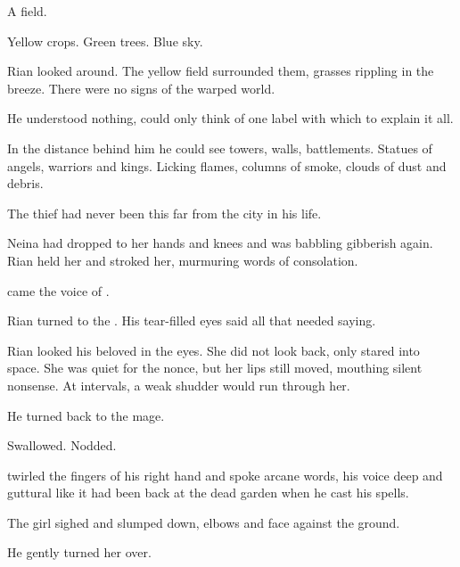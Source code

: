 A field. 

Yellow crops. 
Green trees. 
Blue sky. 


Rian looked around. 
The yellow field surrounded them, grasses rippling in the breeze. 
There were no signs of the warped world. 

He understood nothing, could only think of one label with which to explain it all. 

In the distance behind him he could see towers, walls, battlements. 
Statues of angels, warriors and kings. 
Licking flames, columns of smoke, clouds of dust and debris. 

The thief had never been this far from the city in his life. 

Neina had dropped to her hands and knees and was babbling gibberish again. 
Rian held her and stroked her, murmuring words of consolation. 

 came the voice of \Ishnaruchaefir. 

Rian turned to the \dragon. 
His tear-filled eyes said all that needed saying. 


Rian looked his beloved in the eyes. 
She did not look back, only stared into space. 
She was quiet for the nonce, but her lips still moved, mouthing silent nonsense. 
At intervals, a weak shudder would run through her. 


He turned back to the \draconian{} mage. 

Swallowed. Nodded. 

\Ishnaruchaefir{} twirled the fingers of his right hand and spoke arcane words, his voice deep and guttural like it had been back at the dead garden when he cast his spells. 

The girl sighed and slumped down, elbows and face against the ground. 

He gently turned her over. 


